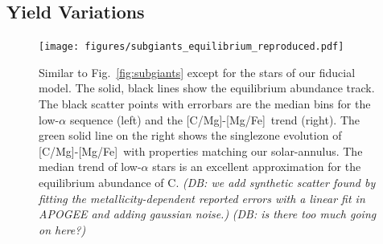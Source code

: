 \documentclass[fleqn,
usenatbib]{mnras}
\newcommand{\agb}{AGB}
\newcommand{\cc}{CCSN}
\newcommand{\ia}{SN Ia}
\newcommand{\caah}{[C/Mg]-[Mg/H]}
\newcommand{\caafe}{[C/Mg]-[Mg/Fe]}
\newcommand{\dbnote}[1]{ {\color{Thistle} \textit{\small (DB: #1)}} }
\begin{document}
% 

\subsection{Yield Variations}\label{sec:results_highmass}
\label{sec:agb_results}


\begin{figure}
    \centering
    \texttt{[image: figures/subgiants\_equilibrium\_reproduced.pdf]}
    \caption{Similar to Fig.~\ref{fig:subgiants} except for the stars of our fiducial model. 
    The solid, black lines show the equilibrium abundance track. The black scatter points with errorbars are the median bins for the low-$\alpha$ sequence (left) and the \caafe\ trend (right). The green solid line on the right shows the singlezone evolution of \caafe\ with properties matching our solar-annulus. The median trend of low-$\alpha$ stars is an excellent approximation for the equilibrium abundance of C. 
    \dbnote{we add synthetic scatter found by fitting the metallicity-dependent reported errors with a linear fit in APOGEE and adding gaussian noise.}
    \dbnote{is there too much going on here?}
    \label{fig:equilibrium_validity}
    }
\end{figure}
\end{document}
